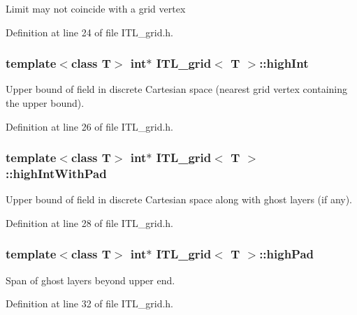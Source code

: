 Limit may not coincide with a grid vertex 

Definition at line 24 of file ITL\_\-grid.h.

\hypertarget{classITL__grid_a60b5b9c9b8586ed362a09ba46dc6a158}{
\subsubsection[{highInt}]{\setlength{\rightskip}{0pt plus 5cm}template$<$class T$>$ int$\ast$ {\bf ITL\_\-grid}$<$ T $>$::{\bf highInt}}}
\label{classITL__grid_a60b5b9c9b8586ed362a09ba46dc6a158}


Upper bound of field in discrete Cartesian space (nearest grid vertex containing the upper bound). 



Definition at line 26 of file ITL\_\-grid.h.

\hypertarget{classITL__grid_ab9793b1da79d6926cc0d739f3da266c0}{
\subsubsection[{highIntWithPad}]{\setlength{\rightskip}{0pt plus 5cm}template$<$class T$>$ int$\ast$ {\bf ITL\_\-grid}$<$ T $>$::{\bf highIntWithPad}}}
\label{classITL__grid_ab9793b1da79d6926cc0d739f3da266c0}


Upper bound of field in discrete Cartesian space along with ghost layers (if any). 



Definition at line 28 of file ITL\_\-grid.h.

\hypertarget{classITL__grid_ac0d5d2e030b31036112cdcb3204d91ed}{
\subsubsection[{highPad}]{\setlength{\rightskip}{0pt plus 5cm}template$<$class T$>$ int$\ast$ {\bf ITL\_\-grid}$<$ T $>$::{\bf highPad}}}
\label{classITL__grid_ac0d5d2e030b31036112cdcb3204d91ed}


Span of ghost layers beyond upper end. 



Definition at line 32 of file ITL\_\-grid.h.

